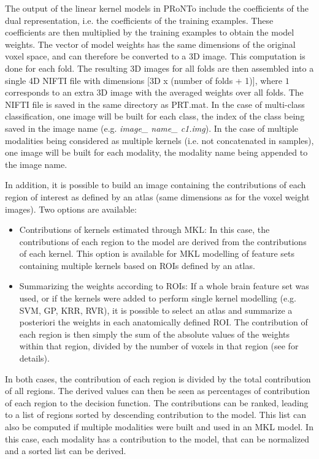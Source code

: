 The output of the linear kernel models in PRoNTo include the coefficients of the dual representation, i.e. the coefficients of the training examples. These coefficients are then multiplied by the training examples to obtain the model weights. The vector of model weights has the same dimensions of the original voxel space, and can therefore be converted to a 3D image. This computation is done for each fold. The resulting 3D images for all folds are then assembled into a single 4D NIFTI file with dimensions [3D x (number of folds + 1)], where $1$ corresponds to an extra 3D image with the averaged weights over all folds. The NIFTI file is saved in the same directory as PRT.mat. In the case of multi-class classification, one image will be built for each class, the index of the class being saved in the image name (e.g. \textit{image\_ name\_ c1.img}). In the case of multiple modalities being considered as multiple kernels (i.e. not concatenated in samples), one image will be built for each modality, the modality name being appended to the image name.

In addition, it is possible to build an image containing the contributions of each region of interest as defined by an atlas (same dimensions as for the voxel weight images). Two options are available:

\begin{itemize}
\item Contributions of kernels estimated through MKL: In this case, the contributions of each region to the model are derived from the contributions of each kernel. This option is available for MKL modelling of feature sets containing multiple kernels based on ROIs defined by an atlas.
\item Summarizing the weights according to ROIs: If a whole brain feature set was used, or if the kernels were added to perform single kernel modelling (e.g. SVM, GP, KRR, RVR), it is possible to select an atlas and summarize a posteriori the weights in each anatomically defined ROI. The contribution of each region is then simply the sum of the absolute values of the weights within that region, divided by the number of voxels in that region (see \cite{Schrouff2013a} for details).
\end{itemize}

In both cases, the contribution of each region is divided by the total contribution of all regions. The derived values can then be seen as percentages of contribution of each region to the decision function. The contributions can be ranked, leading to a list of regions sorted by descending contribution to the model. This list can also be computed if multiple modalities were built and used in an MKL model. In this case, each modality has a contribution to the model, that can be normalized and a sorted list can be derived.

